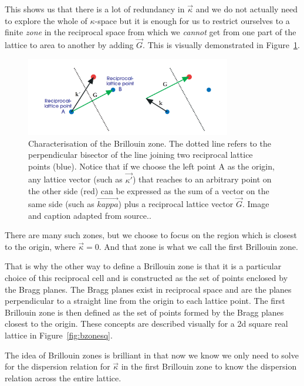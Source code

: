 This shows us that there is a lot of redundancy in $\vec{\kappa}$ and we do not
actually need to explore the whole of $\kappa$-space but it is enough for us to
restrict ourselves to a finite \textit{zone} in the reciprocal space from which
we \textit{cannot} get from one part of the lattice to area to another by
adding $\vec{G}$. This is visually demonstrated in Figure~\ref{fig:kappaspace}.

\begin{figure}[!h]
\centering
\includegraphics[width=0.8\textwidth]{imgs/kappaspace.PNG}
\caption{\label{fig:kappaspace} Characterisation of the Brillouin zone. The
  dotted line refers to the perpendicular bisector of the line joining two
  reciprocal lattice points (blue). Notice that if we choose the left point A
  as the origin, any lattice vector (such as $\vec{\kappa'}$) that reaches to
  an arbitrary point on the other side (red) can be expressed as the sum of a
  vector on the same side (such as $\vec{kappa}$) plus a reciprocal lattice
  vector $\vec{G}$. Image and caption adapted from source.\cite{moldinglight}.}
\end{figure}

There are many such zones, but we choose to focus on the region which is
closest to the origin, where $\vec{\kappa}=0$. And that zone is what we call
the first Brillouin zone. 

That is why the other way to define a Brillouin zone is that it is a particular
choice of this reciprocal cell and is constructed as the set of points enclosed
by the Bragg planes. The Bragg planes exist in reciprocal space and are the
planes perpendicular to a straight line from the origin to each lattice point.
The first Brillouin zone is then defined as the set of points formed by the
Bragg planes closest to the origin. These concepts are described visually for a
2d square real lattice in Figure~\ref{fig:bzonesq}.

The idea of Brillouin zones is brilliant in that now we know we only need to
solve for the dispersion relation for $\vec{\kappa}$ in the first Brillouin
zone to know the dispersion relation across the entire lattice.
